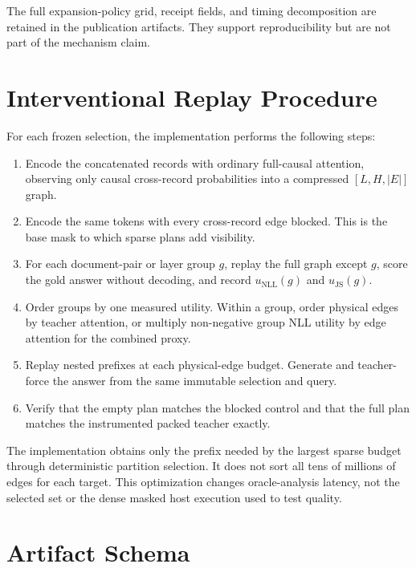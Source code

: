 \documentclass[11pt]{article}
\begin{document}
The full expansion-policy grid, receipt fields, and timing decomposition are
retained in the publication artifacts. They support reproducibility but are not
part of the mechanism claim.

\section{Interventional Replay Procedure}

For each frozen selection, the implementation performs the following steps:
\begin{enumerate}[leftmargin=*]
    \item Encode the concatenated records with ordinary full-causal attention,
    observing only causal cross-record probabilities into a compressed
    $[L,H,|E|]$ graph.
    \item Encode the same tokens with every cross-record edge blocked. This is
    the base mask to which sparse plans add visibility.
    \item For each document-pair or layer group $g$, replay the full graph
    except $g$, score the gold answer without decoding, and record
    $u_{\mathrm{NLL}}(g)$ and $u_{\mathrm{JS}}(g)$.
    \item Order groups by one measured utility. Within a group, order physical
    edges by teacher attention, or multiply non-negative group NLL utility by
    edge attention for the combined proxy.
    \item Replay nested prefixes at each physical-edge budget. Generate and
    teacher-force the answer from the same immutable selection and query.
    \item Verify that the empty plan matches the blocked control and that the
    full plan matches the instrumented packed teacher exactly.
\end{enumerate}

The implementation obtains only the prefix needed by the largest sparse
budget through deterministic partition selection. It does not sort all tens of
millions of edges for each target. This optimization changes oracle-analysis
latency, not the selected set or the dense masked host execution used to test
quality.

\section{Artifact Schema}
\end{document}
